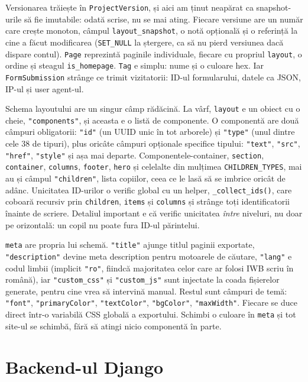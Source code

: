 \documentclass[12pt,a4paper]{report}
\begin{document}
Versionarea trăiește în \texttt{ProjectVersion}, și aici am ținut neapărat ca
snapshot-urile să fie imutabile: odată scrise, nu se mai ating. Fiecare versiune
are un număr care crește monoton, câmpul \texttt{layout\_snapshot}, o notă opțională
și o referință la cine a făcut modificarea (\texttt{SET\_NULL} la ștergere, ca să nu
pierd versiunea dacă dispare contul). \texttt{Page} reprezintă paginile individuale,
fiecare cu propriul \texttt{layout}, o ordine și steagul \texttt{is\_homepage}.
\texttt{Tag} e simplu: nume și o culoare hex. Iar \texttt{FormSubmission} strânge
ce trimit vizitatorii: ID-ul formularului, datele ca JSON, IP-ul și user agent-ul.

Schema layoutului are un singur câmp rădăcină. La vârf, \texttt{layout} e un obiect cu
o cheie, \texttt{"components"}, și aceasta e o listă de componente. O componentă are
două câmpuri obligatorii: \texttt{"id"} (un UUID unic în tot arborele) și
\texttt{"type"} (unul dintre cele 38 de tipuri), plus oricâte câmpuri opționale
specifice tipului: \texttt{"text"}, \texttt{"src"}, \texttt{"href"}, \texttt{"style"}
și așa mai departe. Componentele-container, \texttt{section}, \texttt{container},
\texttt{columns}, \texttt{footer}, \texttt{hero} și celelalte din mulțimea
\texttt{CHILDREN\_TYPES}, mai au și câmpul \texttt{"children"}, lista copiilor, ceea
ce le lasă să se imbrice oricât de adânc. Unicitatea ID-urilor o verific global cu un
helper, \texttt{\_collect\_ids()}, care coboară recursiv prin \texttt{children},
\texttt{items} și \texttt{columns} și strânge toți identificatorii înainte de scriere.
Detaliul important e că verific unicitatea \emph{între} niveluri, nu doar pe orizontală: un copil nu poate fura ID-ul părintelui.

\texttt{meta} are propria lui schemă. \texttt{"title"} ajunge titlul paginii
exportate, \texttt{"description"} devine meta description pentru motoarele de căutare,
\texttt{"lang"} e codul limbii (implicit \texttt{"ro"}, fiindcă majoritatea celor care
ar folosi IWB scriu în română), iar \texttt{"custom\_css"} și \texttt{"custom\_js"}
sunt injectate la coada fișierelor generate, pentru cine vrea să intervină manual.
Restul sunt câmpuri de temă: \texttt{"font"}, \texttt{"primaryColor"},
\texttt{"textColor"}, \texttt{"bgColor"}, \texttt{"maxWidth"}. Fiecare se duce
direct într-o variabilă CSS globală a exportului. Schimbi o culoare în \texttt{meta} și
tot site-ul se schimbă, fără să atingi nicio componentă în parte.

\section{Backend-ul Django}
\end{document}
